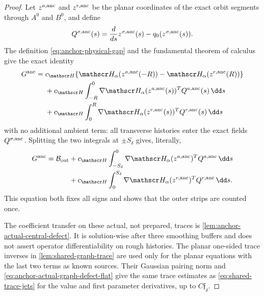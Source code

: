 \begin{proof}
Let \(z^{a,\rm anc}\) and \(z^{r,\rm anc}\) be the planar coordinates of
the exact orbit segments through \(A^0\) and \(B^0\), and define
\[
 Q^{\sigma,\rm anc}(s)
 =\frac{d}{ds}z^{\sigma,\rm anc}(s)-q_0(z^{\sigma,\rm anc}(s)).
\]
The definition \cref{eq:anchor-physical-gap} and the fundamental theorem of
calculus give the exact identity
\begin{align}
 G^{\rm anc}={}&c_{\mathscr H}\{\mathscr H_\alpha
       (z^{a,\rm anc}(-R))
       -\mathscr H_\alpha(z^{r,\rm anc}(R))\}\notag\\
 &+c_{\mathscr H}\int_{-R}^0\nabla\mathscr H_\alpha
       (z^{a,\rm anc}(s))^TQ^{a,\rm anc}(s)\,\dd s\notag\\
 &+c_{\mathscr H}\int_0^R\nabla\mathscr H_\alpha
       (z^{r,\rm anc}(s))^TQ^{r,\rm anc}(s)\,\dd s
                                                        \label{eq:anchor-exact-finite-gap-identity}
\end{align}
with no additional ambient term: all transverse histories enter the exact
fields \(Q^{\sigma,\rm anc}\).  Splitting the two integrals at
\(\pm S_\delta\) gives, literally,
\begin{align}
 G^{\rm anc}
 =\mathcal B_{\rm out}
 &+c_{\mathscr H}\int_{-S_\delta}^{0}
   \nabla\mathscr H_\alpha(z^{a,\rm anc})^T
      Q^{a,\rm anc}\,\dd s\notag\\
 &+c_{\mathscr H}\int_{0}^{S_\delta}
   \nabla\mathscr H_\alpha(z^{r,\rm anc})^T
      Q^{r,\rm anc}\,\dd s .                     \label{eq:anchor-exact-central-outer-split}
\end{align}
This equation both fixes all signs and shows that the outer strips are
counted once.

The coefficient transfer on these actual, not prepared, traces is
\cref{lem:anchor-actual-central-defect}.  It is solution-wise after three
smoothing buffers and does not assert operator differentiability on rough
histories.  The planar one-sided trace inverses in
\cref{lem:shared-graph-trace} are used only for the planar equations with
the last two terms as known sources.  Their Gaussian pairing norm and
\cref{eq:anchor-actual-graph-defect-flat} give the same trace estimates as
\cref{eq:shared-trace-jets} for the value and first parameter derivatives,
up to \(C\mathfrak f_\delta\).


\end{proof}

